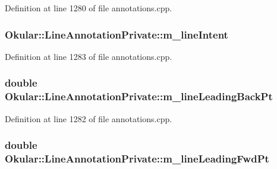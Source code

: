 Definition at line 1280 of file annotations.\+cpp.

\hypertarget{classOkular_1_1LineAnnotationPrivate_a491ace64fcaa9d2156e541d75fc05431}{
\subsubsection[{m\+\_\+line\+Intent}]{ Okular\+::\+Line\+Annotation\+Private\+::m\+\_\+line\+Intent}}\label{classOkular_1_1LineAnnotationPrivate_a491ace64fcaa9d2156e541d75fc05431}


Definition at line 1283 of file annotations.\+cpp.

\hypertarget{classOkular_1_1LineAnnotationPrivate_a98ba85c09e6201d9df8da64c918c6a49}{
\subsubsection[{m\+\_\+line\+Leading\+Back\+Pt}]{\setlength{\rightskip}{0pt plus 5cm}double Okular\+::\+Line\+Annotation\+Private\+::m\+\_\+line\+Leading\+Back\+Pt}}\label{classOkular_1_1LineAnnotationPrivate_a98ba85c09e6201d9df8da64c918c6a49}


Definition at line 1282 of file annotations.\+cpp.

\hypertarget{classOkular_1_1LineAnnotationPrivate_affc0c88c47cf398b4cb52e94cae615ff}{
\subsubsection[{m\+\_\+line\+Leading\+Fwd\+Pt}]{\setlength{\rightskip}{0pt plus 5cm}double Okular\+::\+Line\+Annotation\+Private\+::m\+\_\+line\+Leading\+Fwd\+Pt}}\label{classOkular_1_1LineAnnotationPrivate_affc0c88c47cf398b4cb52e94cae615ff}


